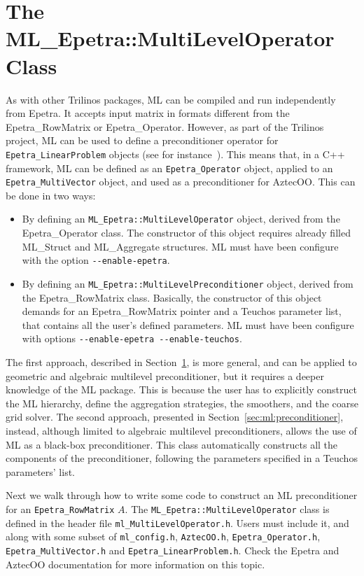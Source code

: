 \section{The ML\_Epetra::MultiLevelOperator Class}
\label{sec:ml:operator}
As with other Trilinos packages, ML can be compiled and run independently
from Epetra. It accepts input matrix in formats different
from the Epetra\_RowMatrix or Epetra\_Operator. However, as part of the
Trilinos project, ML can be used to define a preconditioner operator for
\verb!Epetra_LinearProblem! objects (see for
instance~\cite{Epetra-Ref-Guide}). This means that, in a C++ framework,
ML can be defined as an \verb!Epetra_Operator! object, applied to an
\verb!Epetra_MultiVector!  object, and used as a preconditioner for
AztecOO.  This can be done in two ways:
\begin{itemize}
\item By defining an \verb!ML_Epetra::MultiLevelOperator! object, derived from the
  Epetra\_Operator class. The constructor of this object requires
  already filled ML\_Struct and ML\_Aggregate structures.  ML must have
  been configure with the option \newline \verb!--enable-epetra!.
\item By defining an \verb!ML_Epetra::MultiLevelPreconditioner! object, derived
  from the Epetra\_RowMatrix class. Basically, the constructor of
  this object demands for an Epetra\_RowMatrix  pointer and a
  Teuchos parameter list, that contains all the user's defined
  parameters. ML must have been configure with options \newline
  \verb!--enable-epetra --enable-teuchos!.
\end{itemize}

The first approach, described in Section~\ref{sec:ml:operator}, is more
general, and can be applied to geometric and algebraic multilevel
preconditioner, but it requires a deeper knowledge of the ML package.
This is because the user has to explicitly construct the ML hierarchy,
define the aggregation strategies, the smoothers, and the coarse grid
solver. The second approach, presented in
Section~\ref{sec:ml:preconditioner}, instead, although limited to algebraic
multilevel preconditioners, allows the use of ML as a black-box
preconditioner. This class automatically constructs all the components
of the preconditioner, following the parameters specified in a Teuchos
parameters' list. 

Next we walk through how to write some code to
construct an ML preconditioner for an \verb!Epetra_RowMatrix! $A$.
The \verb!ML_Epetra::MultiLevelOperator! class 
is defined in the header file \verb!ml_MultiLevelOperator.h!.
Users must include it, and along with some subset of
\verb!ml_config.h!,
\verb!AztecOO.h!,
\verb!Epetra_Operator.h!, 
\verb!Epetra_MultiVector.h!
and
\verb!Epetra_LinearProblem.h!.
Check the Epetra and AztecOO documentation for more information on this topic.

